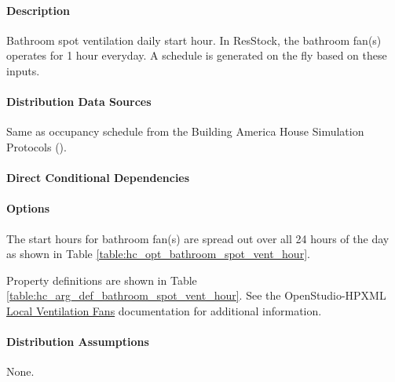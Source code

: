\paragraph{Description}
% 
Bathroom spot ventilation daily start hour. In ResStock, the bathroom fan(s) operates for 1 hour everyday. A schedule is generated on the fly based on these inputs.

\paragraph{Distribution Data Sources}
% 
Same as occupancy schedule from the Building America House Simulation Protocols (\cite{Wilson2014}).

\paragraph{Direct Conditional Dependencies}


\paragraph{Options}
The start hours for bathroom fan(s) are spread out over all 24 hours of the day as shown in Table \ref{table:hc_opt_bathroom_spot_vent_hour}.



Property definitions are shown in Table \ref{table:hc_arg_def_bathroom_spot_vent_hour}. See the OpenStudio-HPXML \href{https://openstudio-hpxml.readthedocs.io/en/v1.10.0/workflow_inputs.html#hpxml-local-ventilation-fans}{Local Ventilation Fans} documentation for additional information.



\paragraph{Distribution Assumptions}
% 
None.
